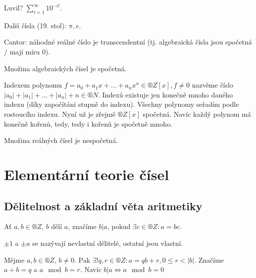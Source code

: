 \documentclass[12pt]{article}                   %
\begin{document}
        \begin{poznamka}
            Luvil? $\sum_{i=1}^∞ 10^{-i!}$.

            Další čísla (19. stol): $\pi, e$.

            Cantor: náhodné reálné číslo je transcendentní (tj. algebraická čísla jsou spočetná / mají míru 0).
        \end{poznamka}

        \begin{tvrzeni}
            Množina algebraických čísel je spočetná.

            \begin{dukazin}
                Indexem polynomu $f = a_0 + a_1x + … + a_nx^n \in ®Z[x], f ≠ 0$ nazvěme číslo $|a_0| + |a_1| + … + |a_n| + n \in ®N$. Indexů existuje jen konečně mnoho daného indexu (díky započítání stupně do indexu). Všechny polynomy seřadím podle rostoucího indexu. Nyní už je zřejmě $®Z[x]$ spočetná. Navíc každý polynom má konečně kořenů, tedy, tedy i kořenů je spočetně mnoho.
            \end{dukazin}
        \end{tvrzeni}

        \begin{tvrzeni}
            Množina reálných čísel je nespočetná.
        \end{tvrzeni}

\section{Elementární teorie čísel}
    \subsection{Dělitelnost a základní věta aritmetiky}
        \begin{definice}
            Ať $a, b \in ®Z$, $b$ dělí $a$, značíme $b|a$, pokud $\exists c \in ®Z: a = bc$.

            $±1$ a $±a$ se nazývají nevlastní dělitelé, ostatní jsou vlastní.
        \end{definice}

        \begin{tvrzeni}
            Mějme $a, b \in ®Z$, $b≠0$. Pak $\exists! q, r \in ®Z: a = qb+r, 0≤r<|b|$. Značíme $a \div b = q$ a $a \mod b = r$. Navíc $b|a \Leftrightarrow a \mod b = 0$
        \end{tvrzeni}
\end{document}
